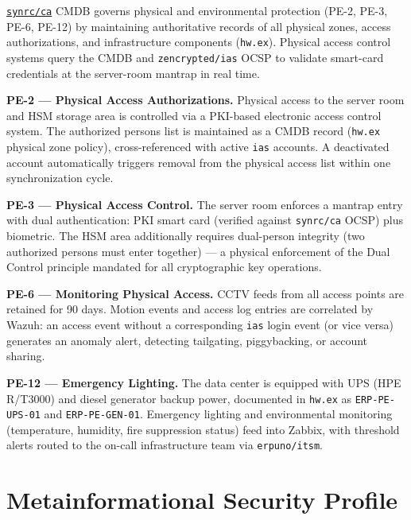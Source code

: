 \documentclass{article}
\begin{document}
\href{https://github.com/synrc/ca}{\texttt{synrc/ca}} CMDB governs physical and environmental protection (PE-2, PE-3, PE-6, PE-12) by maintaining authoritative records of all physical zones, access authorizations, and infrastructure components (\texttt{hw.ex}). Physical access control systems query the CMDB and \texttt{zencrypted/ias} OCSP to validate smart-card credentials at the server-room mantrap in real time.

\textbf{PE-2 --- Physical Access Authorizations.}
Physical access to the server room and HSM storage area is controlled via a PKI-based electronic access control system. The authorized persons list is maintained as a CMDB record (\texttt{hw.ex} physical zone policy), cross-referenced with active \texttt{ias} accounts. A deactivated account automatically triggers removal from the physical access list within one synchronization cycle.

\textbf{PE-3 --- Physical Access Control.}
The server room enforces a mantrap entry with dual authentication: PKI smart card (verified against \texttt{synrc/ca} OCSP) plus biometric. The HSM area additionally requires dual-person integrity (two authorized persons must enter together) --- a physical enforcement of the Dual Control principle mandated for all cryptographic key operations.

\textbf{PE-6 --- Monitoring Physical Access.}
CCTV feeds from all access points are retained for 90 days. Motion events and access log entries are correlated by Wazuh: an access event without a corresponding \texttt{ias} login event (or vice versa) generates an anomaly alert, detecting tailgating, piggybacking, or account sharing.

\textbf{PE-12 --- Emergency Lighting.}
The data center is equipped with UPS (HPE R/T3000) and diesel generator backup power, documented in \texttt{hw.ex} as \texttt{ERP-PE-UPS-01} and \texttt{ERP-PE-GEN-01}. Emergency lighting and environmental monitoring (temperature, humidity, fire suppression status) feed into Zabbix, with threshold alerts routed to the on-call infrastructure team via \texttt{erpuno/itsm}.


\newpage
\newpage
\newpage
\section{Metainformational Security Profile}

\end{document}
